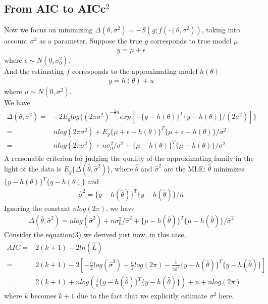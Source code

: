 \documentclass{article}
\begin{document}
\subsection{From AIC to AICc$^{2}$}
Now we focus on minimizing $\Delta(\theta, \sigma^2)=-S(g;f(\cdot \mid \theta, \sigma^2))$, taking into account $\sigma^2$ as a parameter. Suppose the true $g$ corresponds to true model $\mu$
\begin{align}
y=\mu+\epsilon
\end{align}
where $\epsilon \sim N(0, \sigma_0^2)$.\\
And the estimating $f$ corresponds to the approximating model $h(\theta)$
\begin{align}
y=h(\theta)+u
\end{align}
where $u \sim N(0, \sigma^2)$.\\
We have
\begin{align*}
\Delta(\theta, \sigma^2)=&-2E_glog\{(2\pi \sigma^2)^{-\frac{1}{2}n}exp[-\{y-h(\theta)\}^T\{y-h(\theta)\}/(2\sigma^2)]\}\\=&n log(2\pi \sigma^2)+E_g\{\mu+\epsilon-h(\theta)\}^T\{\mu+\epsilon-h(\theta)\}/\sigma^2\\=&n log(2\pi \sigma^2)+n\sigma_0^2/\sigma^2+\{\mu-h(\theta)\}^T\{\mu-h(\theta)\}/\sigma^2
\end{align*}
A reasonable criterion for judging the quality of the approximating family in the light of the data is $E_g\{\Delta(\hat{\theta}, \hat{\sigma}^2)\}$, where $\hat{\theta}$ and $\hat{\sigma}^2$ are the MLE: $\hat{\theta}$ minimizes $\{y-h(\theta)\}^T\{y-h(\theta)\}$ and 
\begin{align*}
\hat{\sigma}^2=\{y-h(\hat{\theta})\}^T\{y-h(\hat{\theta})\}/n
\end{align*}
Ignoring the constant $n log(2\pi)$, we have
\begin{align*}
\Delta(\hat{\theta}, \hat{\sigma}^2)=n log(\hat{\sigma}^2)+n\sigma_0^2/\hat{\sigma}^2+\{\mu-h(\hat{\theta})\}^T\{\mu-h(\hat{\theta})\}/\hat{\sigma}^2
\end{align*}
Consider the equation(3) we derived just now, in this case,
\begin{align*}
AIC=&2(k+1)-2ln(\hat{L})\\=&2(k+1)-2[-\frac{n}{2}log (\hat{\sigma}^2)-\frac{n}{2}log (2\pi)-\frac{1}{2\hat{\sigma}^2}\{y-h(\hat{\theta})\}^T\{y-h(\hat{\theta})\}]\\=&2(k+1)+n log(\frac{1}{n}\{y-h(\hat{\theta})\}^T\{y-h(\hat{\theta})\})+n+n log(2\pi)
\end{align*}
where $k$ becomes $k+1$ due to the fact that we explicitly estimate $\sigma^2$ here.\\
\end{document}
